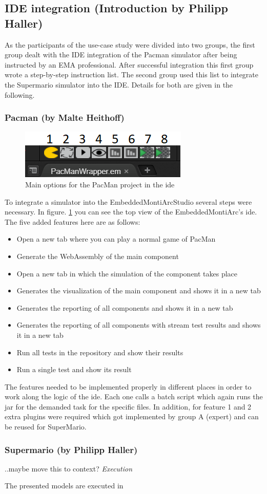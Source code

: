 \subsection{IDE integration (Introduction by Philipp Haller)}

As the participants of the use-case study were divided into two groups, the first group dealt with the IDE integration of the Pacman simulator after being instructed by an EMA professional.
After successful integration this first group wrote a step-by-step instruction list. The second group used this list to integrate the Supermario simulator into the IDE. Details for both are given in the following.

\subsubsection{Pacman (by Malte Heithoff)}
\begin{figure}
	\label{fig:idePacmanTop}
	\centering
	\includegraphics[scale=0.55]{pictures/IDE/IDETop.png}
	\caption{Main options for the PacMan project in the ide}
\end{figure}
To integrate a simulator into the EmbeddedMontiArcStudio several steps were necessary. In figure. \ref{fig:idePacmanTop} you can see the top view of the EmbeddedMontiArc's ide. The five added features here are as follows:
\begin{itemize}
	\item[1.] Open a new tab where you can play a normal game of PacMan
	\item[2.] Generate the WebAssembly of the main component
	\item[3.] Open a new tab in which the simulation of the component takes place
	\item[4.] Generates the visualization of the main component and shows it in a new tab
	\item[5.] Generates the reporting of all components and shows it in a new tab
	\item[6.] Generates the reporting of all components with stream test results and shows it in a new tab
	\item[7.] Run all tests in the repository and show their results
	\item[8.] Run a single test and show its result
\end{itemize}
The features needed to be implemented properly in different places in order to work along the logic of the ide. Each one calls a batch script which again runs the jar for the demanded task for the specific files. In addition, for feature 1 and 2 extra plugins were required which got implemented by group A (expert) and can be reused for SuperMario.

\subsubsection{Supermario (by Philipp Haller)}
..maybe move this to context?
\emph{Execution}

The presented models are executed in